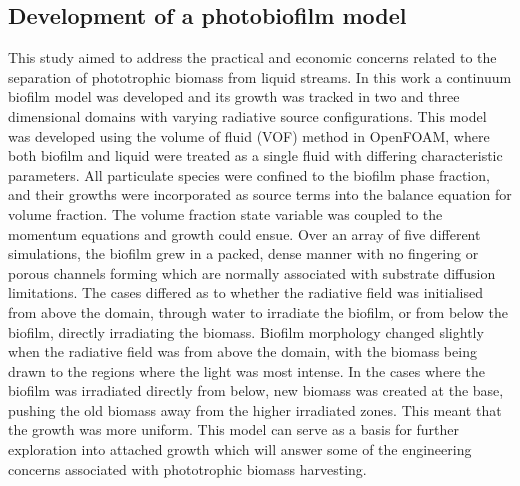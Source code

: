\subsection{Development of a photobiofilm model}
This study aimed to address the practical and economic concerns related to the separation of phototrophic biomass from liquid streams. In this work a continuum biofilm model was developed and its growth was tracked in two and three dimensional domains with varying radiative source configurations. 
\skippingparagraph
This model was developed using the volume of fluid (VOF) method in OpenFOAM, where both biofilm and liquid were treated as a single fluid with differing characteristic parameters. All particulate species were confined to the biofilm phase fraction, and their growths were incorporated as source terms into the balance equation for volume fraction. The volume fraction state variable was coupled to the momentum equations and growth could ensue.
\skippingparagraph
Over an array of five different simulations, the biofilm grew in a packed, dense manner with no fingering or porous channels forming which are normally associated with substrate diffusion limitations. The cases differed as to whether the radiative field was initialised from above the domain, through water to irradiate the biofilm, or from below the biofilm, directly irradiating the biomass. Biofilm morphology changed slightly when the radiative field was from above the domain, with the biomass being drawn to the regions where the light was most intense. In the cases where the biofilm was irradiated directly from below, new biomass was created at the base, pushing the old biomass away from the higher irradiated zones. This meant that the growth was more uniform. This model can serve as a basis for further exploration into attached growth which will answer some of the engineering concerns associated with phototrophic biomass harvesting. 



